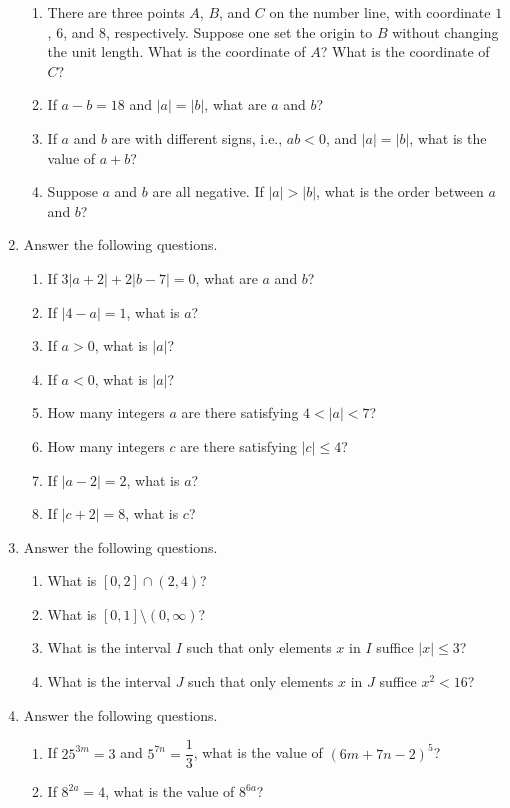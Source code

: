 \documentclass[11pt]{book}
\theoremstyle{break}
\theoremstyle{no_label}
\numberwithin{equation}{section}
\begin{document}
\begin{enumerate}[label=\arabic*.]
\begin{enumerate}
        \item There are three points $A$, $B$, and $C$ on the number line, with coordinate $1$, $6$, and $8$, respectively. Suppose one set the origin to $B$ without changing the unit length. What is the coordinate of $A$? What is the coordinate of $C$?
        \item If $a-b=18$ and $|a|=|b|$, what are $a$ and $b$?
        \item If $a$ and $b$ are with different signs, i.e., $ab<0$, and $|a|=|b|$, what is the value of $a+b$?
        \item Suppose $a$ and $b$ are all negative. If $|a|>|b|$, what is the order between $a$ and $b$?
    \end{enumerate}
    \item Answer the following questions.
    \begin{enumerate}
        \item If $3|a+2|+2|b-7|=0$, what are $a$ and $b$?
        \item If $|4-a|=1$, what is $a$?
        \item If $a>0$, what is $|a|$?
        \item If $a<0$, what is $|a|$?
        \item How many integers $a$ are there satisfying $4<|a|<7$?
        \item How many integers $c$ are there satisfying $|c|\leq 4$?
        \item If $|a-2|=2$, what is $a$?
        \item If $|c+2|=8$, what is $c$?
    \end{enumerate}
    \item Answer the following questions.
    \begin{enumerate}
        \item What is $[0, 2]\cap(2, 4)$?
        \item What is $[0, 1]\setminus(0, \infty)$?
        \item What is the interval $I$ such that only elements $x$ in $I$ suffice $|x|\leq 3$?
        \item What is the interval $J$ such that only elements $x$ in $J$ suffice $x^2<16$?
    \end{enumerate}
    \item Answer the following questions.
    \begin{enumerate}
        \item If $25^{3m}=3$ and $5^{7n}=\dfrac{1}{3}$, what is the value of $(6m+7n-2)^5$?
        \item If $8^{2a}=4$, what is the value of $8^{6a}$?

\end{enumerate}
\end{enumerate}
\end{document}
